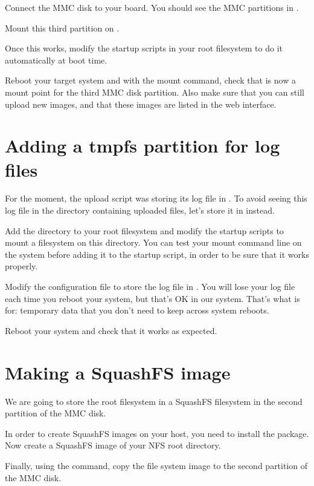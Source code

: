 Connect the MMC disk to your board. You should see the MMC partitions
in .
  
Mount this third partition on .

Once this works, modify the startup scripts in your root filesystem
to do it automatically at boot time.

Reboot your target system and with the mount command, check that
 is now a mount point for the third MMC disk
partition. Also make sure that you can still upload new images, and
that these images are listed in the web interface.

\section{Adding a tmpfs partition for log files}

For the moment, the upload script was storing its log file in
. To avoid seeing this log file in
the directory containing uploaded files, let's store it in
 instead.

Add the  directory to your root filesystem and modify
the startup scripts to mount a  filesystem on this
directory. You can test your  mount command line on the
system before adding it to the startup script, in order to be sure
that it works properly.

Modify the  configuration file to store
the log file in . You will lose your log
file each time you reboot your system, but that's OK in our
system. That's what  is for: temporary data that you don't need
to keep across system reboots.

Reboot your system and check that it works as expected.

\section{Making a SquashFS image}

We are going to store the root filesystem in a SquashFS filesystem in
the second partition of the MMC disk.

In order to create SquashFS images on your host, you need to install
the  package. Now create a SquashFS image of your
NFS root directory.

Finally, using the  command, copy the file system image to
the second partition of the MMC disk.

